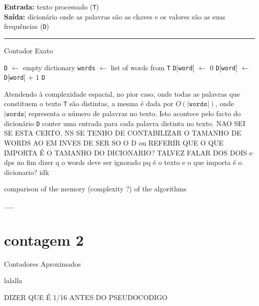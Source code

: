 \documentclass[mirror, portugues]{revdetua}
\begin{document}
\begin{algorithm}[H]
\raggedright
\textbf{Entrada:} texto processado (\texttt{T}) \\
\textbf{Saída:} dicionário onde as palavras são as chaves e os valores são as suas frequências (\texttt{D})\\
\hrule 
\caption{Contador Exato}
\begin{algorithmic}[1]
    \State \texttt{D} $\gets$ empty dictionary
    \State \texttt{words} $\gets$ list of words from \texttt{T}
            \State \texttt{D}[\texttt{word}] $\gets$ 0
        \EndIf
        \State \texttt{D}[\texttt{word}] $\gets$ \texttt{D}[\texttt{word}] + $1$
    \EndFor
    \State \Return \texttt{D}
\end{algorithmic}
\end{algorithm}
    
Atendendo à complexidade espacial, no pior caso, onde todas as palavras que constituem o texto \texttt{T} são distintas, a mesma é dada por $O(|\texttt{words}|)$, onde $|\texttt{words}|$ representa o número de palavras no texto. Isto acontece pelo facto do dicionário \texttt{D} conter uma entrada para cada palavra distinta no texto. NAO SEI SE ESTA CERTO, NS SE TENHO DE CONTABILIZAR O TAMANHO DE WORDS AO EM INVES DE SER SO O D ou REFERIR QUE O QUE IMPORTA É O TAMANHO DO DICIONARIO? TALVEZ FALAR DOS DOIS e dps no fim dizer q o words deve ser ignorado pq é o texto e o que importa é o dicionario? idk

comparison of the memory (complexity ?) of the algorithms

.....



\section{contagem 2}

Contadores Aproximados 

lalalla

DIZER QUE É 1/16 ANTES DO PSEUDOCODIGO
\end{document}
